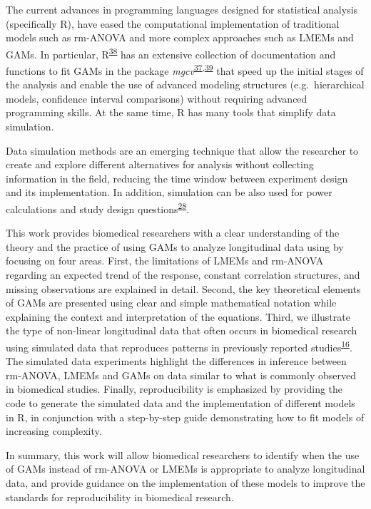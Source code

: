 \documentclass[
]{article}
\begin{document}
The current advances in programming languages designed for statistical analysis (specifically R), have eased the computational implementation of traditional models such as rm-ANOVA and more complex approaches such as LMEMs and GAMs. In particular, R\textsuperscript{\protect\hyperlink{ref-r}{38}} has an extensive collection of documentation and functions to fit GAMs in the package \emph{mgcv}\textsuperscript{\protect\hyperlink{ref-wood2017}{37},\protect\hyperlink{ref-wood2016}{39}} that speed up the initial stages of the analysis and enable the use of advanced modeling structures (e.g.~hierarchical models, confidence interval comparisons) without requiring advanced programming skills. At the same time, R has many tools that simplify data simulation.

Data simulation methods are an emerging technique that allow the researcher to create and explore different alternatives for analysis without collecting information in the field, reducing the time window between experiment design and its implementation. In addition, simulation can be also used for power calculations and study design questions\textsuperscript{\protect\hyperlink{ref-haverkamp2017}{28}}.

This work provides biomedical researchers with a clear understanding of the theory and the practice of using GAMs to analyze longitudinal data using by focusing on four areas. First, the limitations of LMEMs and rm-ANOVA regarding an expected trend of the response, constant correlation structures, and missing observations are explained in detail. Second, the key theoretical elements of GAMs are presented using clear and simple mathematical notation while explaining the context and interpretation of the equations. Third, we illustrate the type of non-linear longitudinal data that often occurs in biomedical research using simulated data that reproduces patterns in previously reported studies\textsuperscript{\protect\hyperlink{ref-vishwanath2009}{16}}. The simulated data experiments highlight the differences in inference between rm-ANOVA, LMEMs and GAMs on data similar to what is commonly observed in biomedical studies. Finally, reproducibility is emphasized by providing the code to generate the simulated data and the implementation of different models in R, in conjunction with a step-by-step guide demonstrating how to fit models of increasing complexity.

In summary, this work will allow biomedical researchers to identify when the use of GAMs instead of rm-ANOVA or LMEMs is appropriate to analyze longitudinal data, and provide guidance on the implementation of these models to improve the standards for reproducibility in biomedical research.
\end{document}
